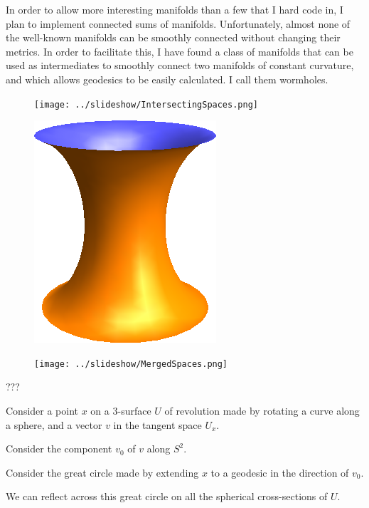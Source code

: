 \documentclass[12pt]{amsart}
\begin{document}

In order to allow more interesting manifolds than a few that I hard code in, I plan to implement connected sums of manifolds. Unfortunately, almost none of the well-known manifolds can be smoothly connected without changing their metrics. In order to facilitate this, I have found a class of manifolds that can be used as intermediates to smoothly connect two manifolds of constant curvature, and which allows geodesics to be easily calculated. I call them wormholes.

\begin{figure}

\texttt{[image: ../slideshow/IntersectingSpaces.png]}

\includegraphics[scale=0.3]{PortalSpace.png}

\texttt{[image: ../slideshow/MergedSpaces.png]}

\end{figure}

???



Consider a point $x$ on a $3$-surface $U$ of revolution made by rotating a curve along a sphere, and a vector $v$ in the tangent space $U_x$.

Consider the component $v_0$ of $v$ along $S^2$.

Consider the great circle made by extending $x$ to a geodesic in the direction of $v_0$.

We can reflect across this great circle on all the spherical cross-sections of $U$.
\end{document}
